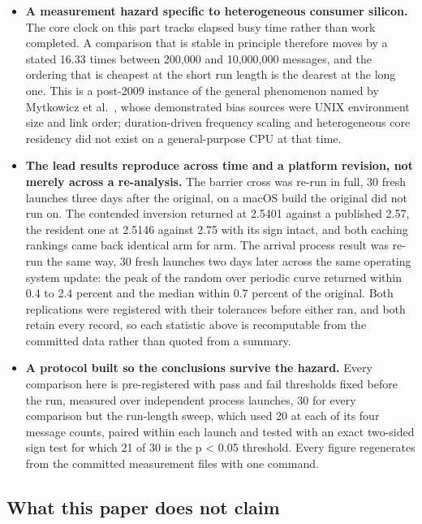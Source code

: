 \documentclass[conference]{IEEEtran}
\begin{document}
\begin{itemize}
\item \textbf{A measurement hazard specific to heterogeneous consumer silicon.}
The core clock on this part tracks elapsed busy time rather than work
completed. A comparison that is stable in principle therefore moves by a stated
16.33 times between 200,000 and 10,000,000 messages, and the ordering that is
cheapest at the short run length is the dearest at the long one. This is a
post-2009 instance of the general phenomenon named by Mytkowicz et
al.~\cite{mytkowicz2009wrong}, whose demonstrated bias sources were UNIX
environment size and link order; duration-driven frequency scaling and
heterogeneous core residency did not exist on a general-purpose CPU at that
time.

\item \textbf{The lead results reproduce across time and a platform revision,
not merely across a re-analysis.} The barrier cross was re-run in full, 30
fresh launches three days after the original, on a macOS build the original
did not run on. The contended inversion returned at 2.5401 against a published
2.57, the resident one at 2.5146 against 2.75 with its sign intact, and both
caching rankings came back identical arm for arm. The arrival process result
was re-run the same way, 30 fresh launches two days later across the same
operating system update: the peak of the random over periodic curve returned
within 0.4 to 2.4 percent and the median within 0.7 percent of the original.
Both replications were registered with their tolerances before either ran, and
both retain every record, so each statistic above is recomputable from the
committed data rather than quoted from a summary.

\item \textbf{A protocol built so the conclusions survive the hazard.} Every
comparison here is pre-registered with pass and fail thresholds fixed before
the run, measured over independent process launches, 30 for every comparison
but the run-length sweep, which used 20 at each of its four message counts,
paired within each launch and tested with an exact two-sided sign test for
which 21 of 30 is the p < 0.05 threshold. Every figure regenerates from the committed
measurement files with one command.
\end{itemize}

\subsection{What this paper does not claim}
\end{document}
